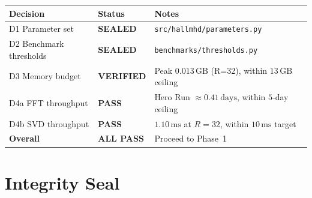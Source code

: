 \documentclass[11pt, a4paper]{article}
\begin{document}
\begin{center}
\begin{tabular}{lll}
\toprule
Decision & Status & Notes \\
\midrule
D1 Parameter set & \textcolor{green!60!black}{\textbf{SEALED}} &
  \texttt{src/hallmhd/parameters.py} \\
D2 Benchmark thresholds & \textcolor{green!60!black}{\textbf{SEALED}} &
  \texttt{benchmarks/thresholds.py} \\
D3 Memory budget & \textcolor{green!60!black}{\textbf{VERIFIED}} &
  Peak $0.013\,\text{GB}$ (R=32), within $13\,\text{GB}$ ceiling \\
D4a FFT throughput & \textcolor{green!60!black}{\textbf{PASS}} &
  Hero Run $\approx 0.41\,\text{days}$, within $5$-day ceiling \\
D4b SVD throughput & \textcolor{green!60!black}{\textbf{PASS}} &
  $1.10\,\text{ms}$ at $R=32$, within $10\,\text{ms}$ target \\
\midrule
\textbf{Overall} & \textcolor{green!60!black}{\textbf{ALL PASS}} &
  Proceed to Phase~1 \\
\bottomrule
\end{tabular}
\end{center}

\section{Integrity Seal}
\label{sec:seal}
\end{document}
